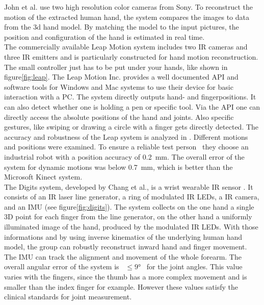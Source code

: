 John et al. use two high resolution color cameras from Sony. To reconstruct the motion of the extracted human hand, the system compares the images to data from the 3d hand model. By matching the model to the input pictures, the position and configuration of the hand is estimated in real time.\\
The commercially available Leap Motion system \cite{leap} includes two IR cameras and three IR emitters and is particularly constructed for hand motion reconstruction. The small controller just has to be put under your hands, like shown in figure\ref{fig:leap}. The Leap Motion Inc. provides a well documented API and software tools for Windows and Mac systems to use their device for basic interaction with a PC. The system directly outputs hand- and fingerpositions. It can also detect whether one is holding a pen or specific tool. Via the API one can directly access the absolute positions of the hand and joints. Also specific gestures, like swiping or drawing a circle with a finger gets directly detected. The accuracy and robustness of the Leap system is analyzed in \cite{weichert2013analysis}. Different motions and positions were examined. To ensure a reliable \grqq test person\grqq~ they choose an industrial robot with a position accuracy of \SI{0.2}{mm}. The overall error of the system for dynamic motions was below \SI{0.7}{\mm}, which is better than the Microsoft Kinect system.\\
The Digits system, developed by Chang et al., is a wrist wearable IR sensor \cite{Digits}. It consists of an IR laser line generator, a ring of modulated IR LEDs, a IR camera, and an IMU (see figure\ref{fig:digits}). The system collects on the one hand a single 3D point for each finger from the line generator, on the other hand a uniformly illuminated image of the hand, produced by the modulated IR LEDs. With those informations and by using inverse kinematics of the underlying human hand model, the group can robustly reconstruct inward hand and finger movement. The IMU can track the alignment and movement of the whole forearm. The overall angular error of the system is~ $ \leq \ang{9}$~ for the joint angles. This value varies with the fingers, since the thumb has a more complex movement and is smaller than the index finger for example. However these values satisfy the clinical standards for joint measurement.\\

